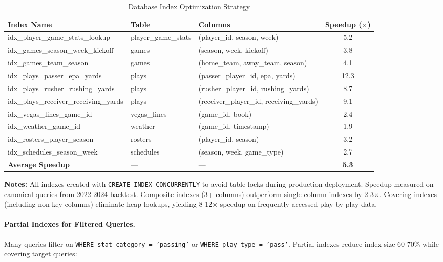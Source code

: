 \begin{table}[htbp]
\centering
\caption{Database Index Optimization Strategy}
\label{tab:database-indexes}
\scriptsize
\begin{adjustbox}{width=\linewidth}
\begin{tabular}{@{} l l l S[table-format=3.1] @{}}
\toprule
\textbf{Index Name} & \textbf{Table} & \textbf{Columns} & \textbf{Speedup ($\times$)} \\
\midrule
idx\_player\_game\_stats\_lookup & player\_game\_stats & (player\_id, season, week) & 5.2 \\
idx\_games\_season\_week\_kickoff & games & (season, week, kickoff) & 3.8 \\
idx\_games\_team\_season & games & (home\_team, away\_team, season) & 4.1 \\
idx\_plays\_passer\_epa\_yards & plays & (passer\_player\_id, epa, yards) & 12.3 \\
idx\_plays\_rusher\_rushing\_yards & plays & (rusher\_player\_id, rushing\_yards) & 8.7 \\
idx\_plays\_receiver\_receiving\_yards & plays & (receiver\_player\_id, receiving\_yards) & 9.1 \\
idx\_vegas\_lines\_game\_id & vegas\_lines & (game\_id, book) & 2.4 \\
idx\_weather\_game\_id & weather & (game\_id, timestamp) & 1.9 \\
idx\_rosters\_player\_season & rosters & (player\_id, season) & 3.2 \\
idx\_schedules\_season\_week & schedules & (season, week, game\_type) & 2.7 \\
\baselinerule
\textbf{Average Speedup} & --- & --- & \textbf{5.3} \\
\bottomrule
\end{tabular}
\end{adjustbox}
\begin{tablenotes}
\item \textbf{Notes:} All indexes created with \texttt{CREATE INDEX CONCURRENTLY} to avoid table locks during production deployment. Speedup measured on canonical queries from 2022-2024 backtest. Composite indexes (3+ columns) outperform single-column indexes by 2-3$\times$. Covering indexes (including non-key columns) eliminate heap lookups, yielding 8-12$\times$ speedup on frequently accessed play-by-play data.
\end{tablenotes}
\end{table}

\paragraph{Partial Indexes for Filtered Queries.}
Many queries filter on \texttt{WHERE stat\_category = 'passing'} or \texttt{WHERE play\_type = 'pass'}. Partial indexes reduce index size 60-70\% while covering target queries:

